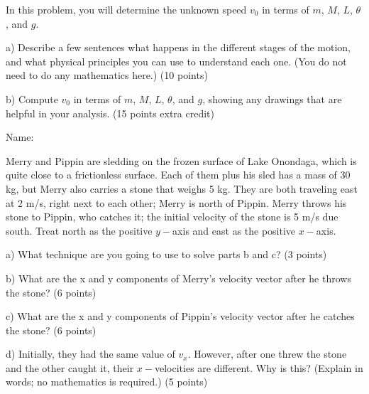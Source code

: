 \documentclass[12pt]{article}
\begin{document}
  In this problem, you will determine the unknown speed $v_0$ in terms of $m$, $M$, $L$, $\theta$, and $g$.

  \it \bigskip 

  a) Describe a few sentences what happens in the different stages of the motion, and what physical principles you can use to understand each one. (You do not need to do any mathematics here.) (10 points)

  \bigskip

  \vspace{2in}

  b) Compute $v_0$ in terms of $m$, $M$, $L$, $\theta$, and $g$, showing any drawings that are helpful in your analysis. (15 points extra credit)

  \newpage


\newpage

\begin{flushright}
Name: \underline{\hspace{3in}}
        \end{flushright}

        \Large \centerline{}
        \normalsize
        \rm

Merry and Pippin are sledding on the frozen surface of Lake Onondaga, which is quite close to a frictionless surface. Each of them plus his sled has a mass of 30 kg, but Merry also carries a stone that weighs 5 kg.
They are both traveling east at 2 m/s, right next to each other; Merry is north of Pippin. Merry throws his stone to Pippin, who catches it; the initial velocity of the stone is 5 m/s due south. Treat north as the positive $y-$axis and east as the 
positive $x-$axis.

\it \bigskip

a) What technique are you going to use to solve parts b and c? (3 points)

\vspace{0.3in}

b) What are the x and y components of Merry's velocity vector after he throws the stone? (6 points)

\vspace{1in}

c) What are the x and y components of Pippin's velocity vector after he catches the stone? (6 points)

\vspace{1in}

d) Initially, they had the same value of $v_x$. However, after one threw the stone and the other caught it, their $x-$velocities are different. Why is this? (Explain in words; no mathematics is required.) (5 points)
\end{document}
